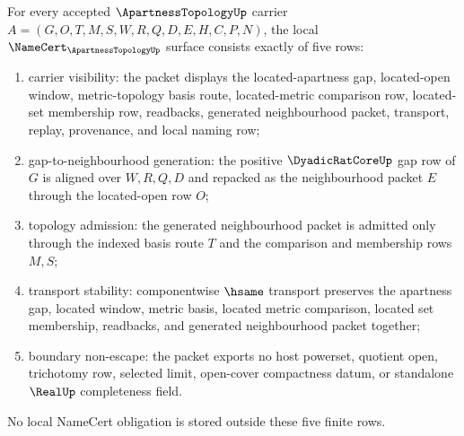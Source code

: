 
\begin{theorem}
\label{thm:apartnesstopology-namecert-obligation-surface}
For every accepted $\ApartnessTopologyUp$ carrier $A=(G,O,T,M,S,W,R,Q,D,E,H,C,P,N)$, the local $\NameCert_{\ApartnessTopologyUp}$ surface consists exactly of five rows:
\begin{enumerate}
\item carrier visibility: the packet displays the located-apartness gap, located-open window, metric-topology basis route, located-metric comparison row, located-set membership row, readbacks, generated neighbourhood packet, transport, replay, provenance, and local naming row;
\item gap-to-neighbourhood generation: the positive $\DyadicRatCoreUp$ gap row of $G$ is aligned over $W,R,Q,D$ and repacked as the neighbourhood packet $E$ through the located-open row $O$;
\item topology admission: the generated neighbourhood packet is admitted only through the indexed basis route $T$ and the comparison and membership rows $M,S$;
\item transport stability: componentwise $\hsame$ transport preserves the apartness gap, located window, metric basis, located metric comparison, located set membership, readbacks, and generated neighbourhood packet together;
\item boundary non-escape: the packet exports no host powerset, quotient open, trichotomy row, selected limit, open-cover compactness datum, or standalone $\RealUp$ completeness field.
\end{enumerate}
No local NameCert obligation is stored outside these five finite rows.
\end{theorem}
